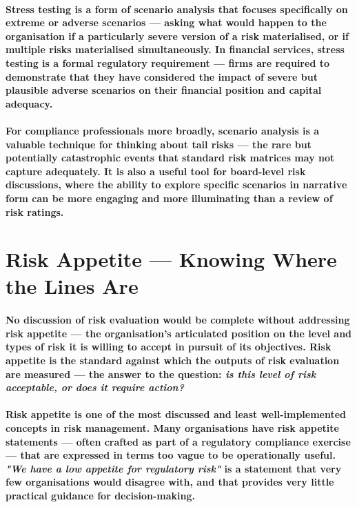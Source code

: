 \paragraph{\textbf{Stress testing} is a form of scenario analysis that focuses specifically on extreme or adverse scenarios — asking what would happen to the organisation if a particularly severe version of a risk materialised, or if multiple risks materialised simultaneously. In financial services, stress testing is a formal regulatory requirement — firms are required to demonstrate that they have considered the impact of severe but plausible adverse scenarios on their financial position and capital adequacy.}
\paragraph{For compliance professionals more broadly, scenario analysis is a valuable technique for thinking about tail risks — the rare but potentially catastrophic events that standard risk matrices may not capture adequately. It is also a useful tool for board-level risk discussions, where the ability to explore specific scenarios in narrative form can be more engaging and more illuminating than a review of risk ratings.}

\section{Risk Appetite — Knowing Where the Lines Are}
\paragraph{No discussion of risk evaluation would be complete without addressing \textbf{risk appetite} — the organisation's articulated position on the level and types of risk it is willing to accept in pursuit of its objectives. Risk appetite is the standard against which the outputs of risk evaluation are measured — the answer to the question: \textit{is this level of risk acceptable, or does it require action?}}
\paragraph{Risk appetite is one of the most discussed and least well-implemented concepts in risk management. Many organisations have risk appetite statements — often crafted as part of a regulatory compliance exercise — that are expressed in terms too vague to be operationally useful. \textit{"We have a low appetite for regulatory risk"} is a statement that very few organisations would disagree with, and that provides very little practical guidance for decision-making.}
